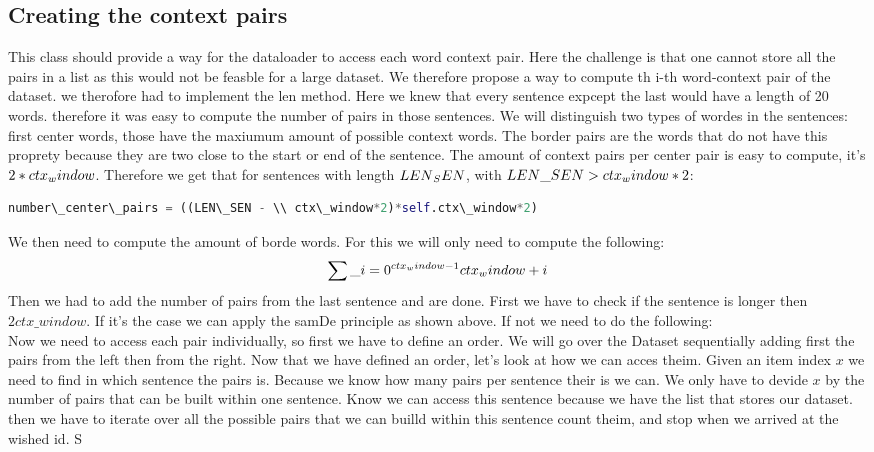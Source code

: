 \subsection{Creating the context pairs}
This class should provide a way for the dataloader to access each word context pair. Here the challenge is that one cannot store all the pairs in a list as this would not be feasble for a large dataset. We therefore propose a way to compute th i-th word-context pair of the dataset. we therofore had to implement the len method. Here we knew that every sentence expcept the last would have a length of 20 words. therefore it was easy to compute the number of pairs in those sentences.
We will distinguish two types of wordes in the sentences: first center words, those have the maxiumum amount of possible context words. The border pairs are the words that do not have this proprety because they are two close to the start or end of the sentence. The amount of context pairs per center pair is easy to compute, it's $2*ctx\\_window$. Therefore we get that for sentences with length $LEN\\_SEN$, with $LEN\_SEN  > ctx\\_window*2$:
\begin{lstlisting}[language=python]
number\_center\_pairs = ((LEN\_SEN - \\ ctx\_window*2)*self.ctx\_window*2)
\end{lstlisting}
We then need to compute the amount of borde words. For this we will only need to compute the following:
\begin{equation}
\sum\_{i=0}^{ctx\\_window -1} ctx\\_window + i
\end{equation}
 Then we had to add the number of pairs from the last sentence and are done. First  we have to check if the sentence is longer then $2 ctx\_window$. 
 If it's the case we can apply the samDe principle as shown above. If not we need to do the following:\\
Now we need to access each pair individually, so first we have to define an order. We will go over the Dataset sequentially adding first the pairs from the left then from the right. Now that we have defined an order, let's look at how we can acces theim. Given an item index $x$ we need to find in which sentence the pairs is. Because we know how many pairs per sentence their is we can. We only have to devide $x$ by the number of pairs that can be built within one sentence. Know we can access this sentence because we have the list that stores our dataset. then we have to iterate over all the possible pairs that we can builld within this sentence count theim, and stop when we arrived at the wished id. S

